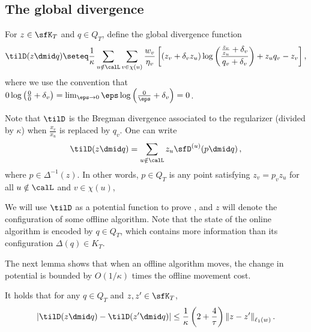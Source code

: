 \subsection{The global divergence}

For $z \in \sfK_T$ and $q \in Q_T$, 
define the global divergence function
\[
\tilD(z \dmid q) \seteq \frac1{\kappa} \sum_{u \notin \calL} \sum_{v \in \chi(u)} \frac{w_v}{\eta_v} \left[ \left(z_v + \delta_v z_u\right) \log \left(\frac{\frac{z_v}{z_u}+\delta_v}{q_v+\delta_v}\right)
+ z_u q_v - z_v\right]
,
\]
where we use the convention 
that $0 \log \left(\frac{0}{0}+\delta_v\right) = \lim_{\eps \to 0} \eps \log \left(\frac{0}{\eps}+\delta_v\right) = 0$. 

Note that $\tilD$ is the Bregman divergence associated to the regularizer  (divided by $\kappa$) when $\frac{x_v}{x_{u}}$ is replaced by $q_v$. 
One can write
\[
   \tilD(z \dmid q) = \sum_{u \notin \calL} z_u\sfD^{(u)}\!\left(p \dmid q\right),
\]
where $p\in \Delta^{-1}(z)$. 
In other words, $p \in Q_T$ is any point satisfying $z_v=p_vz_u$ for all $u \notin \calL$ and $v\in\chi(u)$,

%

We will use $\tilD$ as a potential function to prove ,
and $z$ will denote the configuration of some offline algorithm.
Note that the state of the online algorithm is encoded by $q \in Q_T$, which contains
more information than its configuration $\Delta(q) \in K_T$.

The next lemma shows that when an offline algorithm moves, the change in potential is bounded by $O(1/\kappa)$ times the offline movement cost.

\begin{lemma}\label{lem:lipschitz}
	It holds that for any $q \in Q_T$ and $z,z' \in \sfK_T$,
	\[
	\left|\tilD(z \dmid q) - \tilD(z' \dmid q)\right| \leq \frac{1}{\kappa} \left(2+\frac{4}{\tau}\right) \left\|z-z'\right\|_{\ell_1(w)}.
	\]
\end{lemma}

